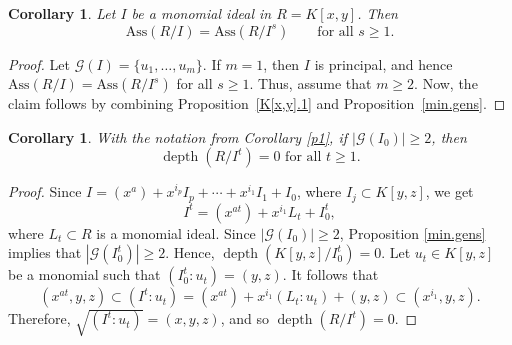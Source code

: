 \documentclass[11pt]{amsart}
\newtheorem{corollary}[theorem]{Corollary}
\def\depth{\operatorname{depth}}
\begin{document}

\begin{corollary}\label{K[x,y].2}
Let $I$ be a monomial ideal in $R=K[x,y]$. Then 
\[
\mathrm{Ass}(R/I)=\mathrm{Ass}(R/I^s) \qquad \text{for all } s\geq 1.
\]
\end{corollary}

\begin{proof}
Let $\mathcal{G}(I)=\{u_1,\ldots,u_m\}$. If $m=1$, then $I$ is principal, and hence
$\mathrm{Ass}(R/I)=\mathrm{Ass}(R/I^s)$ for all $s\geq 1$. Thus, assume that $m\geq 2$. 
Now, the claim follows by combining Proposition~\ref{K[x,y].1} and Proposition~\ref{min.gens}.
\end{proof}
 
 







\begin{corollary}\label{p2}
With the notation from Corollary \ref{p1}, if $|\mathcal{G}(I_0)|\geq 2$, then 
$$\depth(R/I^t)=0 \text{ for all }t\geq 1.$$
\end{corollary}

\begin{proof}
Since $I=(x^a)+x^{i_p}I_p+\cdots+x^{i_1}I_1+I_0$, where $I_j\subset K[y,z]$, we get 
$$I^t = (x^{at})+x^{i_1}L_t+I_0^t,$$
where $L_t\subset R$ is a monomial ideal. Since $|\mathcal{G}(I_0)|\geq 2$,  Proposition \ref{min.gens} 
 implies  that $|\mathcal{G}(I_0^t)|\geq 2$.
 Hence, $\depth(K[y,z]/I_0^t)=0$. Let $u_t\in K[y,z]$ be a monomial such that $(I_0^t:u_t)=(y,z)$.
 It follows that 
$$(x^{at},y,z) \subset (I^t:u_t) = (x^{at})+x^{i_1}(L_t:u_t) + (y,z) \subset (x^{i_1},y,z).$$
Therefore, $\sqrt{(I^t:u_t)}=(x,y,z)$, and so $\depth(R/I^t)=0$.
\end{proof}

\end{document}

